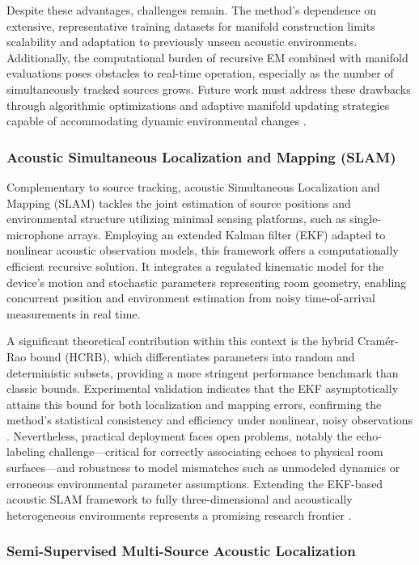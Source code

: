 Despite these advantages, challenges remain. The method's dependence on extensive, representative training datasets for manifold construction limits scalability and adaptation to previously unseen acoustic environments. Additionally, the computational burden of recursive EM combined with manifold evaluations poses obstacles to real-time operation, especially as the number of simultaneously tracked sources grows. Future work must address these drawbacks through algorithmic optimizations and adaptive manifold updating strategies capable of accommodating dynamic environmental changes \cite{ref38}.

\subsubsection{Acoustic Simultaneous Localization and Mapping (SLAM)}

Complementary to source tracking, acoustic Simultaneous Localization and Mapping (SLAM) tackles the joint estimation of source positions and environmental structure utilizing minimal sensing platforms, such as single-microphone arrays. Employing an extended Kalman filter (EKF) adapted to nonlinear acoustic observation models, this framework offers a computationally efficient recursive solution. It integrates a regulated kinematic model for the device's motion and stochastic parameters representing room geometry, enabling concurrent position and environment estimation from noisy time-of-arrival measurements in real time.

A significant theoretical contribution within this context is the hybrid Cramér-Rao bound (HCRB), which differentiates parameters into random and deterministic subsets, providing a more stringent performance benchmark than classic bounds. Experimental validation indicates that the EKF asymptotically attains this bound for both localization and mapping errors, confirming the method’s statistical consistency and efficiency under nonlinear, noisy observations \cite{ref39}. Nevertheless, practical deployment faces open problems, notably the echo-labeling challenge—critical for correctly associating echoes to physical room surfaces—and robustness to model mismatches such as unmodeled dynamics or erroneous environmental parameter assumptions. Extending the EKF-based acoustic SLAM framework to fully three-dimensional and acoustically heterogeneous environments represents a promising research frontier \cite{ref39}.

\subsubsection{Semi-Supervised Multi-Source Acoustic Localization}

